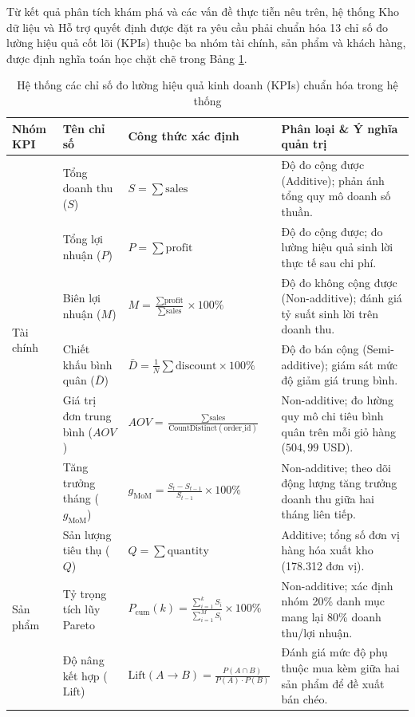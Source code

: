 Từ kết quả phân tích khám phá và các vấn đề thực tiễn nêu trên, hệ thống Kho dữ liệu và Hỗ trợ quyết định được đặt ra yêu cầu phải chuẩn hóa 13 chỉ số đo lường hiệu quả cốt lõi (KPIs) thuộc ba nhóm tài chính, sản phẩm và khách hàng, được định nghĩa toán học chặt chẽ trong Bảng \ref{tab:kpi_definitions}.

\begin{table}[H]
\centering
\caption{Hệ thống các chỉ số đo lường hiệu quả kinh doanh (KPIs) chuẩn hóa trong hệ thống}
\label{tab:kpi_definitions}
\footnotesize
\renewcommand{\arraystretch}{1.3}
\begin{tabularx}{\textwidth}{|l|l|l|X|}
\hline
\textbf{Nhóm KPI} & \textbf{Tên chỉ số} & \textbf{Công thức xác định} & \textbf{Phân loại \& Ý nghĩa quản trị} \\
\hline
\multirow{6}{*}{Tài chính} 
 & Tổng doanh thu ($S$) & $S = \sum \text{sales}$ & Độ đo cộng được (Additive); phản ánh tổng quy mô doanh số thuần. \\ \cline{2-4}
 & Tổng lợi nhuận ($P$) & $P = \sum \text{profit}$ & Độ đo cộng được; đo lường hiệu quả sinh lời thực tế sau chi phí. \\ \cline{2-4}
 & Biên lợi nhuận ($M$) & $M = \frac{\sum \text{profit}}{\sum \text{sales}} \times 100\%$ & Độ đo không cộng được (Non-additive); đánh giá tỷ suất sinh lời trên doanh thu. \\ \cline{2-4}
 & Chiết khấu bình quân ($\bar{D}$) & $\bar{D} = \frac{1}{N}\sum \text{discount} \times 100\%$ & Độ đo bán cộng (Semi-additive); giám sát mức độ giảm giá trung bình. \\ \cline{2-4}
 & Giá trị đơn trung bình ($AOV$) & $AOV = \frac{\sum \text{sales}}{\text{CountDistinct}(\text{order\_id})}$ & Non-additive; đo lường quy mô chi tiêu bình quân trên mỗi giỏ hàng ($504,99$ USD). \\ \cline{2-4}
 & Tăng trưởng tháng ($g_{\text{MoM}}$) & $g_{\text{MoM}} = \frac{S_t - S_{t-1}}{S_{t-1}} \times 100\%$ & Non-additive; theo dõi động lượng tăng trưởng doanh thu giữa hai tháng liên tiếp. \\
\hline
\multirow{3}{*}{Sản phẩm} 
 & Sản lượng tiêu thụ ($Q$) & $Q = \sum \text{quantity}$ & Additive; tổng số đơn vị hàng hóa xuất kho (178.312 đơn vị). \\ \cline{2-4}
 & Tỷ trọng tích lũy Pareto & $P_{\text{cum}}(k) = \frac{\sum_{i=1}^k S_i}{\sum_{i=1}^M S_i} \times 100\%$ & Non-additive; xác định nhóm 20\% danh mục mang lại 80\% doanh thu/lợi nhuận. \\ \cline{2-4}
 & Độ nâng kết hợp ($\text{Lift}$) & $\text{Lift}(A \rightarrow B) = \frac{P(A \cap B)}{P(A) \cdot P(B)}$ & Đánh giá mức độ phụ thuộc mua kèm giữa hai sản phẩm để đề xuất bán chéo. \\

\end{tabularx}
\end{table}
